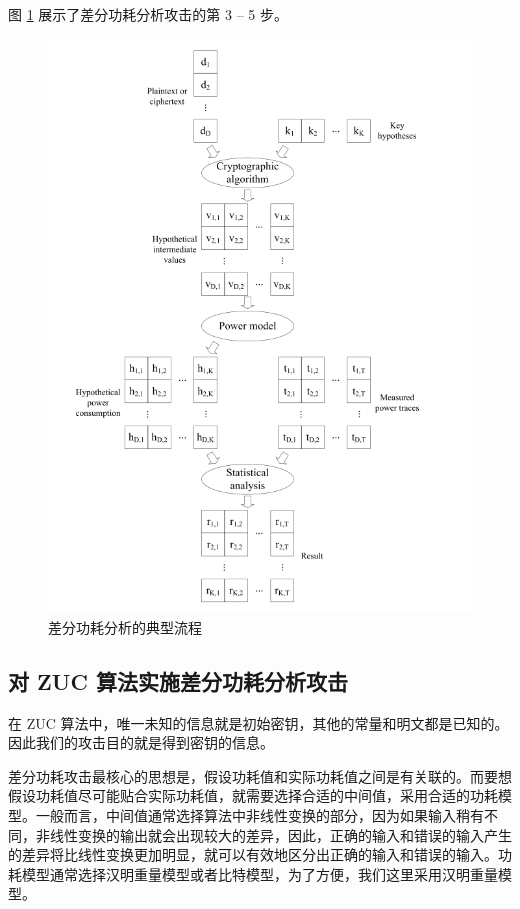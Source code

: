 \vspace*{0.5\baselineskip}

图 \ref{fig:dpa} 展示了差分功耗分析攻击的第 3 -- 5 步。

\begin{figure}[htbp]

    \centering
    \includegraphics[height=.6\textheight]{../images/dpa.png}
    \caption{差分功耗分析的典型流程\cite{paa_en}}
    \label{fig:dpa}
\end{figure}

\subsection{对 ZUC 算法实施差分功耗分析攻击}

在 ZUC 算法中，唯一未知的信息就是初始密钥，其他的常量和明文都是已知的。因此我们的攻击目的就是得到密钥的信息。

差分功耗攻击最核心的思想是，假设功耗值和实际功耗值之间是有关联的。而要想假设功耗值尽可能贴合实际功耗值，就需要选择合适的中间值，采用合适的功耗模型。一般而言，中间值通常选择算法中非线性变换的部分，因为如果输入稍有不同，非线性变换的输出就会出现较大的差异，因此，正确的输入和错误的输入产生的差异将比线性变换更加明显，就可以有效地区分出正确的输入和错误的输入。功耗模型通常选择汉明重量模型或者比特模型，为了方便，我们这里采用汉明重量模型。

